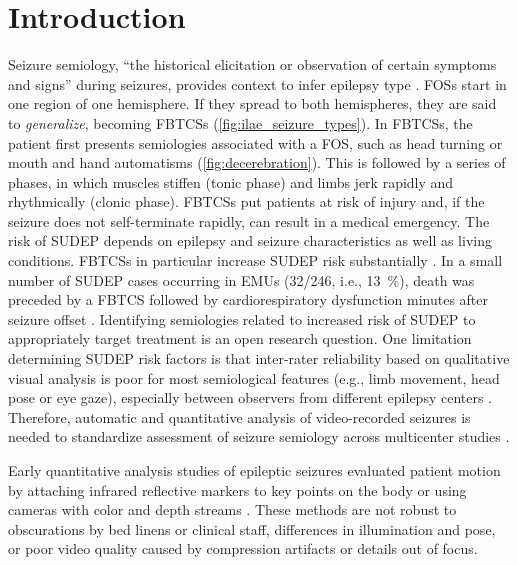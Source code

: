 \section{Introduction}



Seizure semiology, ``the historical elicitation or observation of certain symptoms and signs'' during seizures, provides context to infer epilepsy type \cite{fisher_operational_2017}.
\Acp{FOS} start in one region of one hemisphere.
If they spread to both hemispheres, they are said to \emph{generalize}, becoming \acp{FBTCS} \cite{fisher_operational_2017} (\cref{fig:ilae_seizure_types}).
In \acp{FBTCS}, the patient first presents semiologies associated with a \ac{FOS}, such as head turning or mouth and hand automatisms (\cref{fig:decerebration}).
This is followed by a series of phases, in which muscles stiffen (tonic phase) and limbs jerk rapidly and rhythmically (clonic phase).
\Acp{FBTCS} put patients at risk of injury and, if the seizure does not self-terminate rapidly, can result in a medical emergency.
The risk of \ac{SUDEP} depends on epilepsy and seizure characteristics as well as living conditions.
\Acp{FBTCS} in particular increase \ac{SUDEP} risk substantially \cite{nashef_unifying_2012}.
In a small number of \ac{SUDEP} cases occurring in \acp{EMU} (32/246, i.e., 13~\%), death was preceded by a \ac{FBTCS} followed by cardiorespiratory dysfunction minutes after seizure offset \cite{ryvlin_incidence_2013}.
Identifying semiologies related to increased risk of \ac{SUDEP} to appropriately target treatment is an open research question.
One limitation determining \ac{SUDEP} risk factors is that inter-rater reliability based on qualitative visual analysis is poor for most semiological features (e.g., limb movement, head pose or eye gaze), especially between observers from different epilepsy centers \cite{tufenkjian_seizure_2012}.
Therefore, automatic and quantitative analysis of video-recorded seizures is needed to standardize assessment of seizure semiology across multicenter studies \cite{ahmedtaristizabal_automated_2017}.




Early quantitative analysis studies of epileptic seizures evaluated patient motion by attaching infrared reflective markers to key points on the body or using cameras with color and depth streams \cite{li_z_movement_2002,cunha_movement_2003,odwyer_lateralizing_2007,cunha_neurokinect_2016}.
These methods are not robust to obscurations by bed linens or clinical staff, differences in illumination and pose, or poor video quality caused by compression artifacts or details out of focus.

